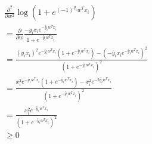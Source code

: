 \documentclass{article}
\newcommand{\1}{\mathbf{1}}
\begin{document}
\begin{align*}
   & \frac{\partial^2}{\partial w^2} \log \left(1 + e^{(-1)^{y_i} w^T x_i} \right)                                                                          \\
   & = \frac{\partial}{\partial w} \frac{-y_i x_i e^{-\tilde{y_i} w^T x_i}}{1 + e^{-\tilde{y_i} w^T x_i}}                                                   \\
   & = \frac{(y_i x_i)^2 e^{-\tilde{y_i} w^T x_i} (1 + e^{-\tilde{y_i} w^T x_i}) - (-y_i x_i e^{-\tilde{y_i} w^T x_i})^2}{(1 + e^{-\tilde{y_i} w^T x_i})^2} \\
   & = \frac{x_i^2 e^{-\tilde{y_i} w^T x_i} (1 + e^{-\tilde{y_i} w^T x_i}) - x_i^2 e^{-2\tilde{y_i} w^T x_i}}{(1 + e^{-\tilde{y_i} w^T x_i})^2}             \\
   & = \frac{x_i^2 e^{-\tilde{y_i} w^T x_i}}{(1 + e^{-\tilde{y_i} w^T x_i})^2}                                                                              \\
   & \geq 0
\end{align*}
\end{document}
